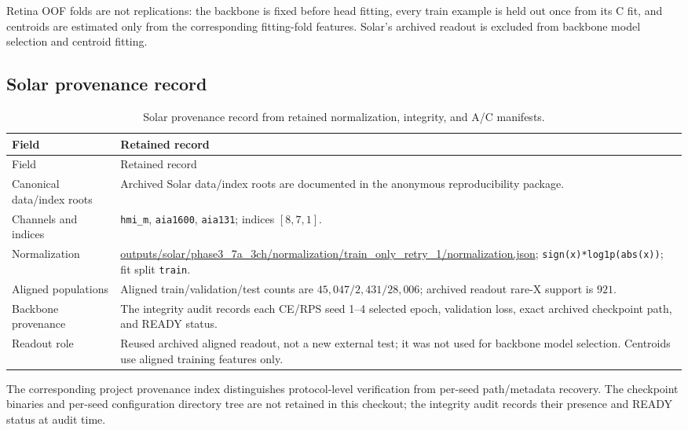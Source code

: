 Retina OOF folds are not replications: the backbone is fixed before head
fitting, every train example is held out once from its C fit, and centroids are
estimated only from the corresponding fitting-fold features. Solar's archived
readout is excluded from backbone model selection and centroid fitting.

\subsection{Solar provenance record}

\begin{longtable}{p{.34\linewidth}p{.57\linewidth}}
\caption{Solar provenance record from retained normalization, integrity, and
A/C manifests.}\label{tab:supp-solar-provenance}\\
\toprule
Field & Retained record \\
\midrule
\endfirsthead
\toprule
Field & Retained record \\
\midrule
\endhead
Canonical data/index roots & Archived Solar data/index roots are documented in the anonymous reproducibility package. \\
Channels and indices & \texttt{hmi\_m}, \texttt{aia1600}, \texttt{aia131}; indices \([8,7,1]\). \\
Normalization & \url{outputs/solar/phase3_7a_3ch/normalization/train_only_retry_1/normalization.json}; \texttt{sign(x)*log1p(abs(x))}; fit split \texttt{train}. \\
Aligned populations & Aligned train/validation/test counts are \(45{,}047/2{,}431/28{,}006\); archived readout rare-X support is \(921\). \\
Backbone provenance & The integrity audit records each CE/RPS seed 1--4 selected epoch, validation loss, exact archived checkpoint path, and READY status. \\
Readout role & Reused archived aligned readout, not a new external test; it was not used for backbone model selection. Centroids use aligned training features only. \\
\bottomrule
\end{longtable}

The corresponding project provenance index distinguishes protocol-level
verification from per-seed path/metadata recovery. The checkpoint binaries and
per-seed configuration directory tree are not retained in this checkout; the
integrity audit records their presence and READY status at audit time.


